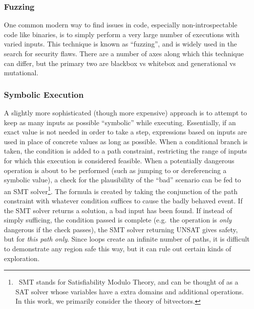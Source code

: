 \subsubsection{Fuzzing}
One common modern way to find issues in code, especially non-introspectable code like binaries, is to simply perform a very large number of executions with varied inputs.
This technique is known as ``fuzzing'', and is widely used in the search for security flaws.
There are a number of axes along which this technique can differ, but the primary two are blackbox\cite{peach,zzuf,rebert2014b} vs whitebox\cite{klee,godefroid2008a,Avgerinos2014a} and generational\cite{peach} vs mutational\cite{zzuf}.

\subsubsection{Symbolic Execution}
A slightly more sophisticated (though more expensive) approach is to attempt to keep as many inputs as possible ``symbolic'' while executing.
Essentially, if an exact value is not needed in order to take a step, expressions based on inputs are used in place of concrete values as long as possible.
When a conditional branch is taken, the condition is added to a path constraint, restricting the range of inputs for which this execution is considered feasible.
When a potentially dangerous operation is about to be performed (such as jumping to or dereferencing a symbolic value), a check for the plausibility of the ``bad'' scenario can be fed to an SMT solver\footnote{\
SMT stands for Satisfiability Modulo Theory, and can be thought of as a SAT solver whose variables have a extra domains and additional operations. In this work, we primarily consider the theory of bitvectors.       
}.
The formula is created by taking the conjunction of the path constraint with whatever condition suffices to cause the badly behaved event.
If the SMT solver returns a solution, a bad input has been found\cite{aeg,mayhem}.
If instead of simply sufficing, the condition passed is complete (e.g.\ the operation is \emph{only} dangerous if the check passes), the SMT solver returning UNSAT gives safety, but for \emph{this path only}.
Since loops create an infinite number of paths, it is difficult to demonstrate any region safe this way, but it can rule out certain kinds of exploration.
